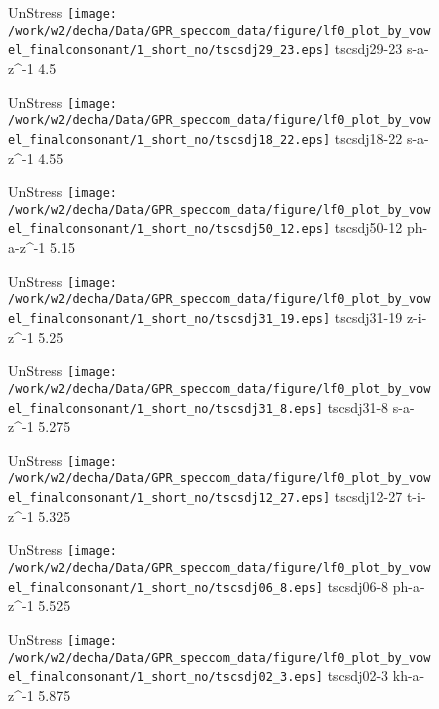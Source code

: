 \documentclass{article}
\begin{document}
\begin{figure}[t]
\begin{minipage}[b]{.24\textwidth}
UnStress
\centering
\texttt{[image: /work/w2/decha/Data/GPR\_speccom\_data/figure/lf0\_plot\_by\_vowel\_finalconsonant/1\_short\_no/tscsdj29\_23.eps]}
tscsdj29-23 s-a-z\textasciicircum-1 4.5
\end{minipage}
\begin{minipage}[b]{.24\textwidth}
UnStress
\centering
\texttt{[image: /work/w2/decha/Data/GPR\_speccom\_data/figure/lf0\_plot\_by\_vowel\_finalconsonant/1\_short\_no/tscsdj18\_22.eps]}
tscsdj18-22 s-a-z\textasciicircum-1 4.55
\end{minipage}
\begin{minipage}[b]{.24\textwidth}
UnStress
\centering
\texttt{[image: /work/w2/decha/Data/GPR\_speccom\_data/figure/lf0\_plot\_by\_vowel\_finalconsonant/1\_short\_no/tscsdj50\_12.eps]}
tscsdj50-12 ph-a-z\textasciicircum-1 5.15
\end{minipage}
\begin{minipage}[b]{.24\textwidth}
UnStress
\centering
\texttt{[image: /work/w2/decha/Data/GPR\_speccom\_data/figure/lf0\_plot\_by\_vowel\_finalconsonant/1\_short\_no/tscsdj31\_19.eps]}
tscsdj31-19 z-i-z\textasciicircum-1 5.25
\end{minipage}
\end{figure}

\begin{figure}[t]
\begin{minipage}[b]{.24\textwidth}
UnStress
\centering
\texttt{[image: /work/w2/decha/Data/GPR\_speccom\_data/figure/lf0\_plot\_by\_vowel\_finalconsonant/1\_short\_no/tscsdj31\_8.eps]}
tscsdj31-8 s-a-z\textasciicircum-1 5.275
\end{minipage}
\begin{minipage}[b]{.24\textwidth}
UnStress
\centering
\texttt{[image: /work/w2/decha/Data/GPR\_speccom\_data/figure/lf0\_plot\_by\_vowel\_finalconsonant/1\_short\_no/tscsdj12\_27.eps]}
tscsdj12-27 t-i-z\textasciicircum-1 5.325
\end{minipage}
\begin{minipage}[b]{.24\textwidth}
UnStress
\centering
\texttt{[image: /work/w2/decha/Data/GPR\_speccom\_data/figure/lf0\_plot\_by\_vowel\_finalconsonant/1\_short\_no/tscsdj06\_8.eps]}
tscsdj06-8 ph-a-z\textasciicircum-1 5.525
\end{minipage}
\begin{minipage}[b]{.24\textwidth}
UnStress
\centering
\texttt{[image: /work/w2/decha/Data/GPR\_speccom\_data/figure/lf0\_plot\_by\_vowel\_finalconsonant/1\_short\_no/tscsdj02\_3.eps]}
tscsdj02-3 kh-a-z\textasciicircum-1 5.875
\end{minipage}
\end{figure}
\end{document}
